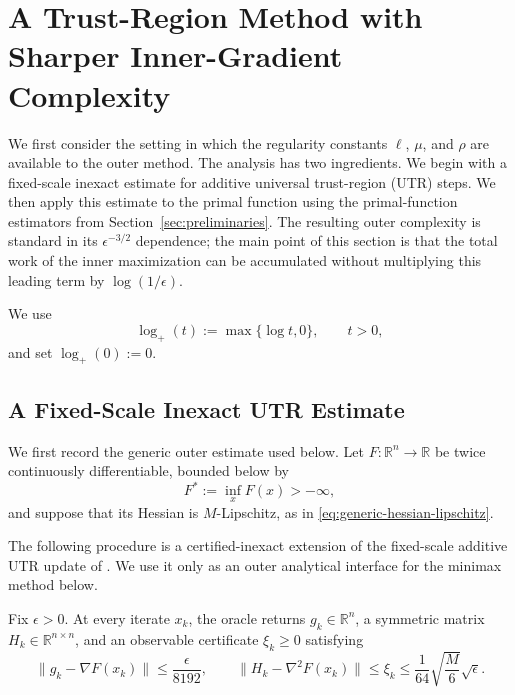 \section{A Trust-Region Method with Sharper Inner-Gradient Complexity}
\label{sec:known-parameter}

We first consider the setting in which the regularity constants
$\ell$, $\mu$, and $\rho$ are available to the outer method.
The analysis has two ingredients. We begin with a fixed-scale
inexact estimate for additive universal trust-region (UTR) steps.
We then apply this estimate to the primal function using the
primal-function estimators from Section~\ref{sec:preliminaries}.
The resulting outer complexity is standard in its
$\epsilon^{-3/2}$ dependence; the main point of this section is that
the total work of the inner maximization can be accumulated without
multiplying this leading term by $\log(1/\epsilon)$.

We use
\[
    \log_+(t):=\max\{\log t,0\},
    \qquad t>0,
\]
and set $\log_+(0):=0$.


\subsection{A Fixed-Scale Inexact UTR Estimate}
\label{sec:fixed-scale-utr}

We first record the generic outer estimate used below.
Let $F:\mathbb{R}^n\to\mathbb{R}$ be twice continuously
differentiable, bounded below by
\[
    F^*:=\inf_x F(x)>-\infty,
\]
and suppose that its Hessian is $M$-Lipschitz, as in
\eqref{eq:generic-hessian-lipschitz}.

The following procedure is a certified-inexact extension of the
fixed-scale additive UTR update of \citet{jiang2026utr}. We use it
only as an outer analytical interface for the minimax method below.

\begin{assumption}
\label{ass:fixed-inexact-oracle}
Fix $\epsilon>0$. At every iterate $x_k$, the oracle returns
$g_k\in\mathbb{R}^n$, a symmetric matrix
$H_k\in\mathbb{R}^{n\times n}$, and an observable certificate
$\xi_k\ge0$ satisfying
\begin{equation}
    \|g_k-\nabla F(x_k)\|
    \le
    \frac{\epsilon}{8192},
    \qquad
    \|H_k-\nabla^2F(x_k)\|
    \le
    \xi_k
    \le
    \frac{1}{64}
    \sqrt{\frac{M}{6}}\sqrt{\epsilon}.
    \label{eq:fixed-oracle-errors}
\end{equation}
\end{assumption}

